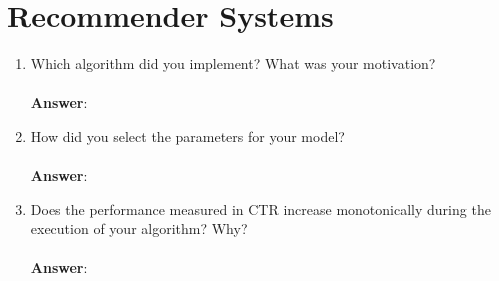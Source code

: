 \documentclass[11pt]{article}
\begin{document}
\section{Recommender Systems}

\begin{enumerate}
\item Which algorithm did you implement? What was your motivation? \\ \\
\textbf{Answer}:

\item How did you select the parameters for your model? \\ \\
\textbf{Answer}:

\item Does the performance measured in CTR increase monotonically during the
execution of your algorithm? Why? \\ \\
\textbf{Answer}:

\end{enumerate}
\end{document}
